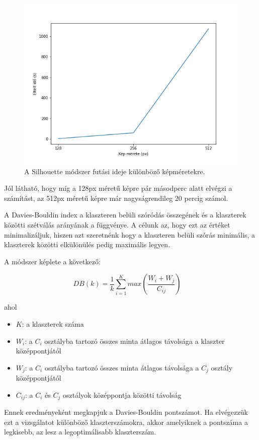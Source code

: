 \begin{figure}[h]
\centering
\includegraphics[scale=0.7]{images/silhouette_runtime.png}
\caption{A Silhouette módszer futási ideje különböző képméretekre.}
\label{fig:silhouette_runtime}
\end{figure}

Jól látható, hogy míg a 128px méretű képre pár másodperc alatt elvégzi a számítást, az 512px méretű képre már nagyságrendileg 20 percig számol.

A Davies-Bouldin index a klaszteren belüli szóródás összegének és a klaszterek közötti szétválás arányának a függvénye. A célunk az, hogy ezt az értéket minimalizáljuk, hiszen azt szeretnénk hogy a klaszteren belüli szórás minimális, a klaszterek közötti elkülönülés pedig maximális legyen.

A módszer képlete a következő:

\[ DB(k)=\frac{1}{k} \sum_{i=1}^{K} max \left(\frac{W_i + W_j}{C_{ij}}\right)  \quad \]

\noindent ahol
\begin{itemize}
\item $K$: a klaszterek száma
\item $W_i$: a $C_i$ osztályba tartozó összes minta átlagos távolsága a klaszter középpontjától
\item $W_{j}$: a $C_i$ osztályba tartozó összes minta átlagos távolsága a $C_j$ osztály középpontjától
\item $C_{ij}$: a $C_i$ és $C_j$ osztályok középpontja közötti távolság
\end{itemize}
Ennek eredményeként megkapjuk a Davies-Bouldin pontszámot. Ha elvégezzük ezt a vizsgálatot különböző klaszterszámokra, akkor amelyiknek a pontszáma a legkisebb, az lesz a legoptimálisabb klaszterszám. \cite{tomatoleaf}

